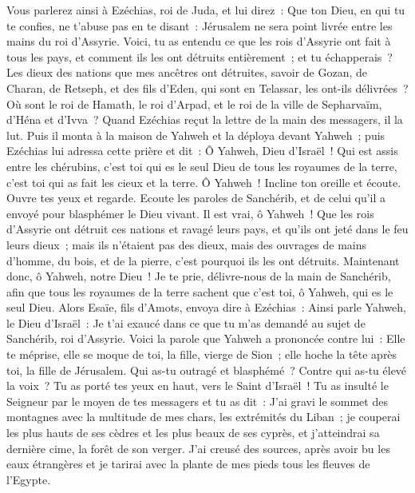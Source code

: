 \begin{multicols}{2}
Vous parlerez ainsi à Ezéchias, roi de Juda, et lui direz~: Que ton Dieu, en qui tu te confies, ne t'abuse pas en te disant~: Jérusalem ne sera point livrée entre les mains du roi d'Assyrie.
Voici, tu as entendu ce que les rois d'Assyrie ont fait à tous les pays, et comment ils les ont détruits entièrement~; et tu échapperais~?
Les dieux des nations que mes ancêtres ont détruites, savoir de Gozan, de Charan, de Retseph, et des fils d'Eden, qui sont en Telassar, les ont-ils délivrées~?
Où sont le roi de Hamath, le roi d'Arpad, et le roi de la ville de Sepharvaïm, d'Héna et d'Ivva~?
Quand Ezéchias reçut la lettre de la main des messagers, il la lut. Puis il monta à la maison de Yahweh et la déploya devant Yahweh~;
puis Ezéchias lui adressa cette prière et dit~: Ô Yahweh, Dieu d'Israël~! Qui est assis entre les chérubins, c'est toi qui es le seul Dieu de tous les royaumes de la terre, c'est toi qui as fait les cieux et la terre.
Ô Yahweh~! Incline ton oreille et écoute. Ouvre tes yeux et regarde. Ecoute les paroles de Sanchérib, et de celui qu’il a envoyé pour blasphémer le Dieu vivant.
Il est vrai, ô Yahweh~! Que les rois d'Assyrie ont détruit ces nations et ravagé leurs pays,
et qu'ils ont jeté dans le feu leurs dieux~; mais ils n'étaient pas des dieux, mais des ouvrages de mains d'homme, du bois, et de la pierre, c'est pourquoi ils les ont détruits.
Maintenant donc, ô Yahweh, notre Dieu~! Je te prie, délivre-nous de la main de Sanchérib, afin que tous les royaumes de la terre sachent que c'est toi, ô Yahweh, qui es le seul Dieu.
Alors Esaïe, fils d'Amots, envoya dire à Ezéchias~: Ainsi parle Yahweh, le Dieu d'Israël~: Je t'ai exaucé dans ce que tu m'as demandé au sujet de Sanchérib, roi d'Assyrie.
Voici la parole que Yahweh a prononcée contre lui~: Elle te méprise, elle se moque de toi, la fille, vierge de Sion~; elle hoche la tête après toi, la fille de Jérusalem.
Qui as-tu outragé et blasphémé~? Contre qui as-tu élevé la voix~? Tu as porté tes yeux en haut, vers le Saint d'Israël~!
Tu as insulté le Seigneur par le moyen de tes messagers et tu as dit~: J'ai gravi le sommet des montagnes avec la multitude de mes chars, les extrémités du Liban~; je couperai les plus hauts de ses cèdres et les plus beaux de ses cyprès, et j'atteindrai sa dernière cime, la forêt de son verger.
J'ai creusé des sources, après avoir bu les eaux étrangères et je tarirai avec la plante de mes pieds tous les fleuves de l'Egypte.

\end{multicols}
